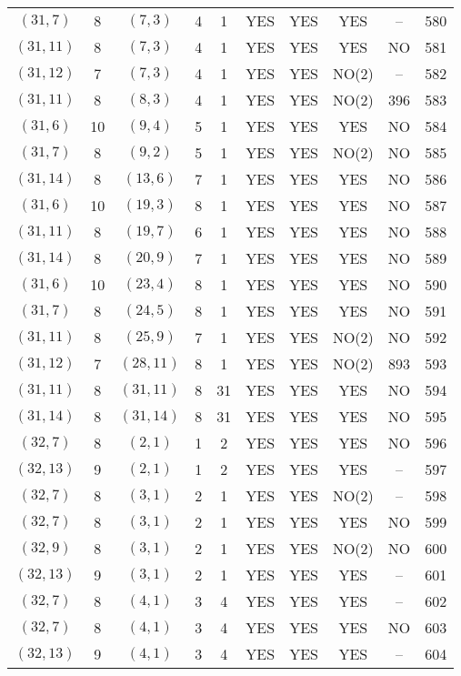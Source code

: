 \begin{longtable}{|c|c|c|c|c|c|c|c|c|c|}
$(31, 7)$ & 8 & $(7, 3)$ & 4 & 1 & YES & YES & YES & -- & 580\\
$(31, 11)$ & 8 & $(7, 3)$ & 4 & 1 & YES & YES & YES & NO & 581\\
$(31, 12)$ & 7 & $(7, 3)$ & 4 & 1 & YES & YES & NO(2) & -- & 582\\
$(31, 11)$ & 8 & $(8, 3)$ & 4 & 1 & YES & YES & NO(2) & 396 & 583\\
$(31, 6)$ & 10 & $(9, 4)$ & 5 & 1 & YES & YES & YES & NO & 584\\
$(31, 7)$ & 8 & $(9, 2)$ & 5 & 1 & YES & YES & NO(2) & NO & 585\\
$(31, 14)$ & 8 & $(13, 6)$ & 7 & 1 & YES & YES & YES & NO & 586\\
$(31, 6)$ & 10 & $(19, 3)$ & 8 & 1 & YES & YES & YES & NO & 587\\
$(31, 11)$ & 8 & $(19, 7)$ & 6 & 1 & YES & YES & YES & NO & 588\\
$(31, 14)$ & 8 & $(20, 9)$ & 7 & 1 & YES & YES & YES & NO & 589\\
$(31, 6)$ & 10 & $(23, 4)$ & 8 & 1 & YES & YES & YES & NO & 590\\
$(31, 7)$ & 8 & $(24, 5)$ & 8 & 1 & YES & YES & YES & NO & 591\\
$(31, 11)$ & 8 & $(25, 9)$ & 7 & 1 & YES & YES & NO(2) & NO & 592\\
$(31, 12)$ & 7 & $(28, 11)$ & 8 & 1 & YES & YES & NO(2) & 893 & 593\\
$(31, 11)$ & 8 & $(31, 11)$ & 8 & 31 & YES & YES & YES & NO & 594\\
$(31, 14)$ & 8 & $(31, 14)$ & 8 & 31 & YES & YES & YES & NO & 595\\
$(32, 7)$ & 8 & $(2, 1)$ & 1 & 2 & YES & YES & YES & NO & 596\\
$(32, 13)$ & 9 & $(2, 1)$ & 1 & 2 & YES & YES & YES & -- & 597\\
$(32, 7)$ & 8 & $(3, 1)$ & 2 & 1 & YES & YES & NO(2) & -- & 598\\
$(32, 7)$ & 8 & $(3, 1)$ & 2 & 1 & YES & YES & YES & NO & 599\\
$(32, 9)$ & 8 & $(3, 1)$ & 2 & 1 & YES & YES & NO(2) & NO & 600\\
$(32, 13)$ & 9 & $(3, 1)$ & 2 & 1 & YES & YES & YES & -- & 601\\
$(32, 7)$ & 8 & $(4, 1)$ & 3 & 4 & YES & YES & YES & -- & 602\\
$(32, 7)$ & 8 & $(4, 1)$ & 3 & 4 & YES & YES & YES & NO & 603\\
$(32, 13)$ & 9 & $(4, 1)$ & 3 & 4 & YES & YES & YES & -- & 604\\

\end{longtable}
